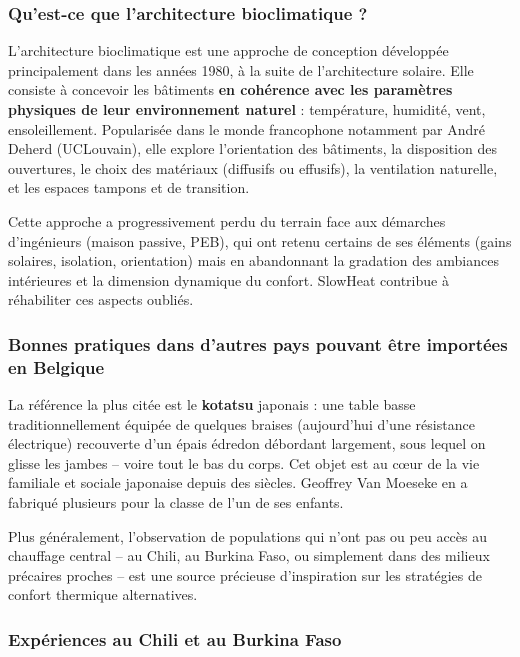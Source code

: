 \subsubsection{Qu'est-ce que l'architecture bioclimatique ?}

L'architecture bioclimatique est une approche de conception développée principalement dans les années 1980, à la suite de l'architecture solaire. Elle consiste à concevoir les bâtiments \textbf{en cohérence avec les paramètres physiques de leur environnement naturel} : température, humidité, vent, ensoleillement. Popularisée dans le monde francophone notamment par André Deherd (UCLouvain), elle explore l'orientation des bâtiments, la disposition des ouvertures, le choix des matériaux (diffusifs ou effusifs), la ventilation naturelle, et les espaces tampons et de transition.

Cette approche a progressivement perdu du terrain face aux démarches d'ingénieurs (maison passive, PEB), qui ont retenu certains de ses éléments (gains solaires, isolation, orientation) mais en abandonnant la gradation des ambiances intérieures et la dimension dynamique du confort. SlowHeat contribue à réhabiliter ces aspects oubliés.

\subsubsection{Bonnes pratiques dans d'autres pays pouvant être importées en Belgique}

La référence la plus citée est le \textbf{kotatsu} japonais : une table basse traditionnellement équipée de quelques braises (aujourd'hui d'une résistance électrique) recouverte d'un épais édredon débordant largement, sous lequel on glisse les jambes -- voire tout le bas du corps. Cet objet est au cœur de la vie familiale et sociale japonaise depuis des siècles. Geoffrey Van Moeseke en a fabriqué plusieurs pour la classe de l'un de ses enfants.

Plus généralement, l'observation de populations qui n'ont pas ou peu accès au chauffage central -- au Chili, au Burkina Faso, ou simplement dans des milieux précaires proches -- est une source précieuse d'inspiration sur les stratégies de confort thermique alternatives.

\subsubsection{Expériences au Chili et au Burkina Faso}

